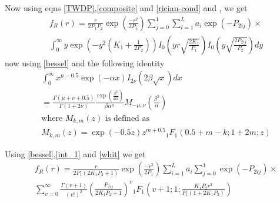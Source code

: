 \documentclass{beamer}
\begin{document}
\begin{frame}
\begin{block}{}
Now using eqns \eqref{TWDP},\eqref{composite} and \eqref{rician-cond} and , we get
\begin{align}
&f_R(r)=\frac{r}{2P_1P_2}\exp\left(\frac{-r^2}{2P_1}\right) \sum_{j=0}^{1} 
       \sum_{i=1}^{L} a_i \exp(-P_{2ij})  \times \\ \nonumber
       &\int_0^\infty y \exp \left( -y^2 \left(K_1+ \frac{1}{2P_2}\right)\right) 
        I_0 \left( yr\sqrt{\frac{2K_1}{P_1}}\right)  I_0 \left( y\sqrt{\frac{2P_{2ij}}{P_2}}\right) dy
\end{align}
now using \eqref{bessel} and the following identity
\begin{align}
    &\int_0^\infty x^{\mu -0.5}\exp(-\alpha x) I_{2\nu} (2\beta \sqrt{x})dx \label{int_1}\\ \nonumber
    &=\frac{\Gamma(\mu +\nu+0.5)}{\Gamma(1+2\nu)}\frac{\exp(\frac{\beta^2}{2\alpha})}{\beta \alpha^\mu} M_{-\mu,\nu}(\frac{\beta^2}{\alpha})\\ \nonumber
    &\text{where \(M_{k,m}(z)\) is defined as } \\
    &M_{k,m}(z)=\exp{(-0.5z)} z^{m+0.5} {}_{1} F_1(0.5+m-k;1+2m;z) \label{whit}
\end{align}
\end{block}
\end{frame}
\begin{frame}
\begin{block}{}
  Using \eqref{bessel},\eqref{int_1} and \eqref{whit} we get 
  \begin{align}
      &f_R(r)=\frac{r}{2P_1(2K_1P_2+1)}\exp\left(\frac{-r^2}{2P_1}\right) \sum_{i=1}^{L} a_i  \sum_{j=0}^{1} 
       \exp(-P_{2ij})  \times \label{f_R} \\ \nonumber
      &\sum_{v=0}^\infty \frac{\Gamma(v+1)}{(v!)^2}\left(\frac{P_{2ij}}{2K_1P_2+1}\right)^v {}_{1}F_{1}
      \left( v+1;1;\frac{K_1P_2r^2}{P_1(1+2K_1P_2)}\right)
  \end{align}
\end{block}
\end{frame}
\end{document}
